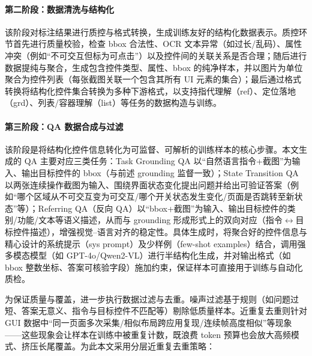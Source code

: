 \paragraph{第二阶段：数据清洗与结构化}
该阶段对标注结果进行质控与格式转换，生成训练友好的结构化数据表示。质控环节首先进行质量校验，检查 bbox 合法性、OCR 文本异常（如过长/乱码）、属性冲突（例如“不可交互但标为可点击”）以及控件间的关联关系是否合理；随后进行数据提纯与聚合，生成包含控件类型、属性、bbox 的纯净样本，并以图片为单位聚合为控件列表（每张截图关联一个包含其所有 UI 元素的集合）；最后通过格式转换将结构化控件集合转换为多种下游格式，以支持指代理解（ref）、定位落地（grd）、列表/容器理解（list）等任务的数据构造与训练。

\paragraph{第三阶段：QA 数据合成与过滤}
该阶段是将结构化控件信息转化为可监督、可解析的训练样本的核心步骤。本文生成的 QA 主要对应三类任务：Task Grounding QA 以“自然语言指令+截图”为输入、输出目标控件的 bbox（与前述 grounding 监督一致）；State Transition QA 以两张连续操作截图为输入、围绕界面状态变化提出问题并给出可验证答案（例如“哪个区域从不可交互变为可交互/哪个开关状态发生变化/页面是否跳转至新状态”等）；Referring QA（反向 QA）以“bbox+截图”为输入、输出目标控件的类别/功能/文本等语义描述，从而与 grounding 形成形式上的双向对应（指令$\leftrightarrow$目标控件描述），增强视觉--语言对齐的稳定性。具体生成时，将聚合好的控件信息与精心设计的系统提示（sys prompt）及少样例（few-shot examples）结合，调用强多模态模型（如 GPT-4o/Qwen2-VL）进行半结构化生成\citep{openai2024gpt4o,bai2025qwen25vl}，并对输出格式（如 bbox 整数坐标、答案可核验字段）施加约束，保证样本可直接用于训练与自动化质检。

为保证质量与覆盖，进一步执行数据过滤与去重。噪声过滤基于规则（如问题过短、答案无意义、指令与目标控件不匹配等）剔除低质量样本。近重复去重则针对 GUI 数据中“同一页面多次采集/相似布局跨应用复现/连续帧高度相似”等现象——这些现象会让样本在训练中被重复计数，既浪费 token 预算也会放大高频模式、挤压长尾覆盖。为此本文采用分层近重复去重策略：

